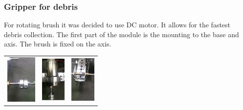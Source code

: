 \subsubsection{Gripper for debris}
For rotating brush it was decided to use DC motor. It allows for the fastest debris collection. \newline
The first part of the module is the mounting to the base and axis. The brush is fixed on the axis.
	\begin{center}
		\begin{tabular}{|p{0.14\linewidth}|p{0.12\linewidth}|p{0.12\linewidth}|}
			{\includegraphics[scale=0.5]{days_L/Gripper/images/01}} & {\includegraphics[scale=0.5]{days_L/Gripper/images/02}} & {\includegraphics[scale=0.5]{days_L/Gripper/images/03}}\\

\end{tabular}
\end{center}
